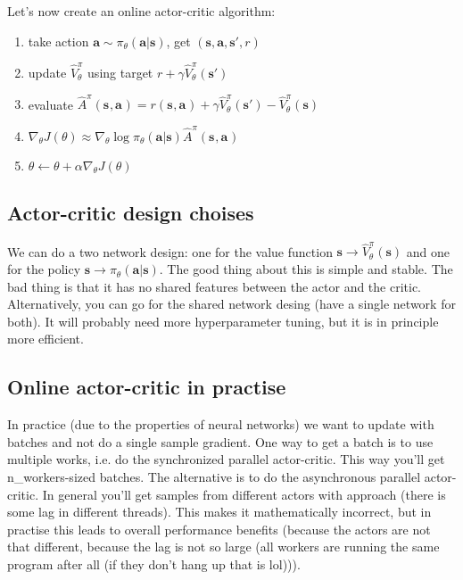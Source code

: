 \documentclass{report}
\begin{document}
Let's now create an online actor-critic algorithm:
\begin{enumerate}
		\item take action $\bm{a} \sim \pi_\theta(\bm{a}|\bm{s})$, get $(\bm{s}, \bm{a},\bm{s'},r)$
		\item update $\hat{V}^\pi_\theta$ using target $r + \gamma \hat{V}^\pi_\theta(\bm{s'})$
		\item evaluate $\hat{A}^\pi(\bm{s}_{}, \bm{a}_{})  = r(\bm{s}_{}, \bm{a}_{}) + \gamma \hat{V}^\pi_\theta(\bm{s'}) - \hat{V}^\pi_\theta(\bm{s})$
		\item $\nabla_\theta J(\theta) \approx \nabla_{\theta} \log \pi_\theta(\bm{a}|\bm{s})\hat{A}^\pi(\bm{s}_{}, \bm{a}_{})$
		\item $\theta \leftarrow \theta  + \alpha \nabla_\theta J(\theta)$
\end{enumerate}

\subsection{Actor-critic design choises}

We can do a two network design: one for the value function $\bm{s} \to \hat{V}^\pi_\theta(\bm{s})$ and one for the policy 
$\bm{s} \to \pi_\theta(\bm{a}|\bm{s})$.
The good thing about this is simple and stable. The bad thing is that it has no shared features between the actor and the critic.
Alternatively, you can go for the shared network desing (have a single network for both).
It will probably need more hyperparameter tuning, but it is in principle more efficient.

\subsection{Online actor-critic in practise}
In practice (due to the properties of neural networks) we want to update with batches and not do a single sample gradient.
One way to get a batch is to use multiple works, i.e. do the synchronized parallel actor-critic.
This way you'll get n\_workers-sized batches.
The alternative is to do the asynchronous parallel actor-critic.
In general you'll get samples from different actors with approach (there is some lag in different threads).
This makes it mathematically incorrect, but in practise this leads to overall performance benefits (because the actors are not that different,
because the lag is not so large (all workers are running the same program after all (if they don't hang up that is lol))).
\end{document}

